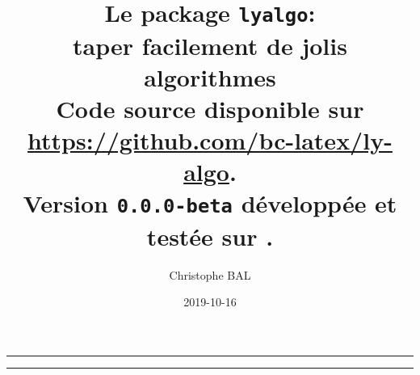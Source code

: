 \documentclass[12pt,a4paper]{article}
\begin{document}
\renewcommand\labelitemi{\raisebox{0.125em}{\tiny\textbullet}}
\renewcommand{\labelitemii}{---}

\title{%
	Le package \texttt{lyalgo}:
	\\
	taper facilement de jolis algorithmes
	\\
	{
		\footnotesize Code source disponible
		sur \url{https://github.com/bc-latex/ly-algo}.%
	}
	\\
	{
		\footnotesize Version \texttt{0.0.0-beta}
		développée et testée sur \macosxname{}.%
	}
}

\author{Christophe BAL}
\date{2019-10-16}

\maketitle


\vspace{2em}

\hrule

\tableofcontents

\vspace{1.5em}

\hrule

\newpage

\end{document}
